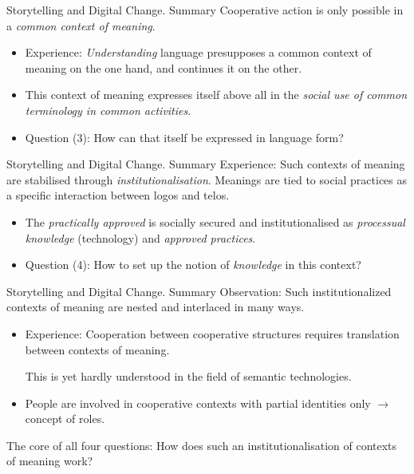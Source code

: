 \documentclass{beamer}
\begin{document}
\begin{frame}{Storytelling and Digital Change. Summary}
Cooperative action is only possible in a \emph{common context of meaning}.
\begin{itemize}
\item Experience: \emph{Understanding} language presupposes a common context
  of meaning on the one hand, and continues it on the other.
\item This context of meaning expresses itself above all in the \emph{social
  use of common terminology in common activities}.
\item Question (3): How can that itself be expressed in language form?
\end{itemize}
\end{frame}
\begin{frame}{Storytelling and Digital Change. Summary}
Experience: Such contexts of meaning are stabilised through
\emph{institutionalisation}. Meanings are tied to social practices as a
specific interaction between logos and telos.
\begin{itemize}
\item The \emph{practically approved} is socially secured and
  institutionalised as \emph{processual knowledge} (technology) and
  \emph{approved practices}.
\item Question (4): How to set up the notion of \emph{knowledge} in this
  context?
\end{itemize}\vspace*{2em}
\end{frame}
\begin{frame}{Storytelling and Digital Change. Summary}
Observation: Such institutionalized contexts of meaning are nested and
interlaced in many ways.
\begin{itemize}
\item Experience: Cooperation between cooperative structures requires
  translation between contexts of meaning.

  This is yet hardly understood in the field of semantic technologies.
\item People are involved in cooperative contexts with partial identities only
  $\to$ concept of roles.
\end{itemize}
The core of all four questions: How does such an institutionalisation of
contexts of meaning work?
\end{frame}
\end{document}

